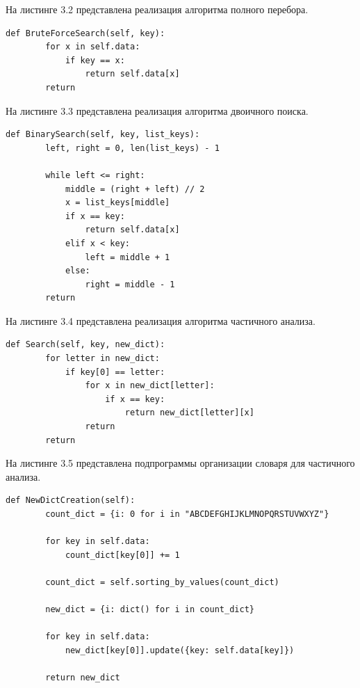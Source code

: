 \documentclass[12pt]{report}
\begin{document}
На листинге 3.2 представлена реализация алгоритма полного перебора.

\begin{lstlisting}[label=some-code,caption=Реализация алгоритма полного перебора]
 def BruteForceSearch(self, key):
        for x in self.data:
            if key == x:
                return self.data[x]
        return 
\end{lstlisting}

На листинге 3.3 представлена реализация алгоритма двоичного поиска.

\begin{lstlisting}[label=some-code,caption=Реализация алгоритма двоичного поиска]
def BinarySearch(self, key, list_keys):
        left, right = 0, len(list_keys) - 1

        while left <= right:
            middle = (right + left) // 2  
            x = list_keys[middle]
            if x == key:
                return self.data[x]
            elif x < key:
                left = middle + 1
            else:
                right = middle - 1
        return 
\end{lstlisting}

На листинге 3.4 представлена реализация алгоритма частичного анализа.

\begin{lstlisting}[label=some-code,caption=Реализация алгоритма частичного анализа]
def Search(self, key, new_dict):
        for letter in new_dict:
            if key[0] == letter:
                for x in new_dict[letter]:
                    if x == key:
                        return new_dict[letter][x]
                return 
        return     
\end{lstlisting}

На листинге 3.5 представлена подпрограммы организации словаря для частичного анализа.

\begin{lstlisting}[label=some-code,caption=Подпрограммы организации словаря для частичного анализа]
def NewDictCreation(self):
        count_dict = {i: 0 for i in "ABCDEFGHIJKLMNOPQRSTUVWXYZ"}
        
        for key in self.data:
            count_dict[key[0]] += 1

        count_dict = self.sorting_by_values(count_dict)

        new_dict = {i: dict() for i in count_dict}

        for key in self.data:
            new_dict[key[0]].update({key: self.data[key]})

        return new_dict
\end{lstlisting}
\end{document}
